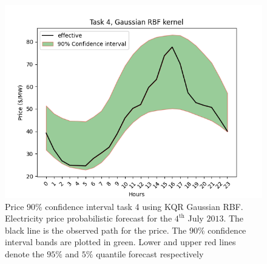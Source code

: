 
\begin{figure}[!ht]
    \centering
    \includegraphics[width=\linewidth]{images/price_task_4_gaussian_rbf.png}
    \caption[Prediction price track task 4, Gaussian RBF kernel]{Price 90\% confidence interval task 4 using KQR Gaussian RBF. Electricity price probabilistic forecast for the $4^{\text{th}}$ July $2013$. The black line is the observed path for the price. The $90\%$ confidence interval bands are plotted in green. Lower and upper red lines denote the $95\%$ and $5\%$ quantile forecast respectively}
    \label{fig:price_task_4_gaussian_rbf}
\end{figure}

